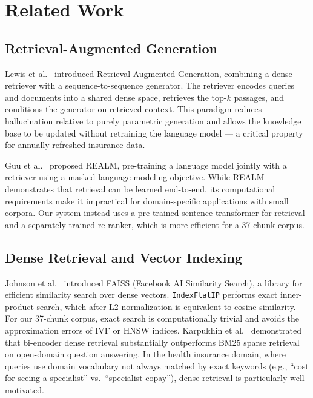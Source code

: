 \documentclass[12pt, letterpaper]{article}
\begin{document}
\section{Related Work}
\label{sec:related}

\subsection{Retrieval-Augmented Generation}

Lewis et al.\ \citep{lewis2020rag} introduced Retrieval-Augmented Generation, combining a dense retriever with a sequence-to-sequence generator. The retriever encodes queries and documents into a shared dense space, retrieves the top-$k$ passages, and conditions the generator on retrieved context. This paradigm reduces hallucination relative to purely parametric generation and allows the knowledge base to be updated without retraining the language model --- a critical property for annually refreshed insurance data.

Guu et al.\ \citep{guu2020realm} proposed REALM, pre-training a language model jointly with a retriever using a masked language modeling objective. While REALM demonstrates that retrieval can be learned end-to-end, its computational requirements make it impractical for domain-specific applications with small corpora. Our system instead uses a pre-trained sentence transformer for retrieval and a separately trained re-ranker, which is more efficient for a 37-chunk corpus.

\subsection{Dense Retrieval and Vector Indexing}

Johnson et al.\ \citep{johnson2019faiss} introduced FAISS (Facebook AI Similarity Search), a library for efficient similarity search over dense vectors. \texttt{IndexFlatIP} performs exact inner-product search, which after L2 normalization is equivalent to cosine similarity. For our 37-chunk corpus, exact search is computationally trivial and avoids the approximation errors of IVF or HNSW indices. Karpukhin et al.\ \citep{karpukhin2020dpr} demonstrated that bi-encoder dense retrieval substantially outperforms BM25 sparse retrieval on open-domain question answering. In the health insurance domain, where queries use domain vocabulary not always matched by exact keywords (e.g., ``cost for seeing a specialist'' vs.\ ``specialist copay''), dense retrieval is particularly well-motivated.
\end{document}
